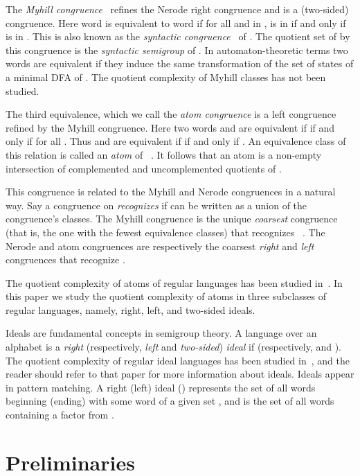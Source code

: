 \documentclass{llncs}
\begin{document}
The \emph{Myhill congruence}~\cite{Myh57} refines the Nerode right congruence and is a (two-sided) congruence. Here word  is equivalent to word  if for all  and  in ,  is in  if and only if  is in . This is also known as the \emph{syntactic congruence}~\cite{Pin97} of . The quotient set of  by this congruence is the \emph{syntactic semigroup} of . 
In automaton-theoretic terms two words are equivalent if they induce the same transformation of the set of states of a minimal DFA of .
The quotient complexity of Myhill classes has not been studied.

The third equivalence, which we call the \emph{atom congruence} is a left congruence refined by the Myhill congruence. Here two words  and  are equivalent if 
  if and only if   for all . 
 Thus  and  are equivalent if
  if and only if .
 An equivalence class of this relation is called an \emph{atom} of ~\cite{BrTa14}. 
It follows that an atom is a non-empty intersection of complemented and uncomplemented quotients of .

This congruence is related to the Myhill and Nerode congruences in a natural way. Say a congruence on  \emph{recognizes}  if  can be written as a union of the congruence's classes. The Myhill congruence is the unique \emph{coarsest} congruence (that is, the one with the fewest equivalence classes) that recognizes ~\cite{Pin97}. The Nerode and atom congruences are respectively the coarsest \emph{right} and \emph{left} congruences that recognize .

The quotient complexity of atoms of regular languages has been studied in~\cite{BrDa14,BrTa13,Iva14}.
In this paper we study the quotient complexity of atoms in three subclasses of regular languages, namely, right, left, and two-sided ideals.

Ideals are fundamental concepts in semigroup theory. A language  over an alphabet  is a 
\emph{right} (respectively, \emph{left} and \emph{two-sided}) \emph{ideal} if  (respectively,  and ).
The quotient complexity of regular ideal languages has been studied in~\cite{BJL13}, and the reader should refer to that paper for more information about ideals.
Ideals appear in  pattern matching.  A right (left) ideal  () represents the set of all words beginning (ending) with some word of a  given set , and  is the set of all words containing a factor from .


\section{Preliminaries}
\end{document}
